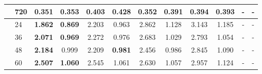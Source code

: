 \begin{table}[ht!]
\begin{center}
\begin{tabular}{ll | cccccccccc}
	& 720 & \textbf{0.351}  & \textbf{0.353}  & 0.403          & 0.428          & 0.352           & 0.391           & 0.394      & 0.393            & -           & -     \\\midrule
\parbox[t]{0.2mm}{}       
	& 24  & \textbf{1.862}  & \textbf{0.869}  & 2.203          & 0.963          & 2.862           & 1.128           & 3.143      & 1.185            & -           & -     \\
	& 36  & \textbf{2.071}  & \textbf{0.969}  & 2.272          & 0.976          & 2.683           & 1.029           & 2.793      & 1.054            & -           & -     \\
	& 48  & \textbf{2.184}  & 0.999           & 2.209          & \textbf{0.981} & 2.456           & 0.986           & 2.845      & 1.090            & -           & -     \\
	& 60  & \textbf{2.507}  & \textbf{1.060}  & 2.545          & 1.061          & 2.630           & 1.057           & 2.957      & 1.124            & -           & -     \\
    \bottomrule
	\end{tabular}
	\end{center}
\end{table}